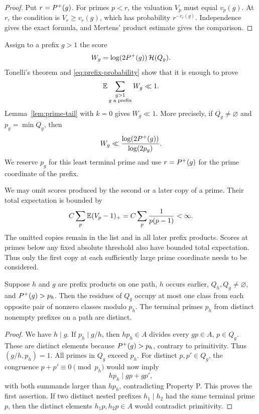 \begin{proof}
Put \(r=P^{+}(g)\). For primes \(p<r\), the valuation
\(V_p\) must equal \(v_p(g)\). At \(r\), the condition is
\(V_r\ge v_r(g)\), which has probability \(r^{-v_r(g)}\).
Independence gives the exact formula, and Mertens' product
estimate gives the comparison.
\end{proof}

Assign to a prefix \(g>1\) the score
\[
 W_g=\log(2P^{+}(g))\,\mathcal H(Q_g).
\]
Tonelli's theorem and \eqref{eq:prefix-probability} show
that it is enough to prove
\begin{equation}\label{eq:expected-score}
 \mathbb E\sum_{\substack{g>1\\g\text{ a prefix}}}W_g\ll1.
\end{equation}
Lemma~\ref{lem:prime-tail} with \(k=0\) gives \(W_g\ll1\).
More precisely, if \(Q_g\ne\varnothing\) and
\(p_g=\min Q_g\), then
\begin{equation}\label{eq:score-basic}
 W_g\ll\frac{\log(2P^{+}(g))}{\log(2p_g)}.
\end{equation}
We reserve \(p_g\) for this least terminal prime and use
\(r=P^{+}(g)\) for the prime coordinate of the prefix.

We may omit scores produced by the second or a later
copy of a prime. Their total expectation is bounded by
\[
 C\sum_p\mathbb E(V_p-1)_+
     =C\sum_p\frac1{p(p-1)}<\infty.
\]
The omitted copies remain in the list and in all later
prefix products. Scores at primes below any fixed absolute
threshold also have bounded total expectation.
Thus only the first copy at each sufficiently large
prime coordinate needs to be considered.

\begin{lemma}\label{lem:inheritance}
Suppose \(h\) and \(g\) are prefix products on one path,
\(h\) occurs earlier, \(Q_h,Q_g\ne\varnothing\), and
\(P^{+}(g)>p_h\). Then the residues of \(Q_g\) occupy
at most one class from each opposite pair of nonzero
classes modulo \(p_h\). The terminal primes \(p_h\)
from distinct nonempty prefixes on a path are distinct.
\end{lemma}

\begin{proof}
We have \(h\mid g\). If \(p_h\mid g/h\), then
\(hp_h\in A\) divides every \(gp\in A\), \(p\in Q_g\).
These are distinct elements because \(P^{+}(g)>p_h\),
contrary to primitivity. Thus \((g/h,p_h)=1\).
All primes in \(Q_g\) exceed \(p_h\).
For distinct \(p,p'\in Q_g\), the congruence
\(p+p'\equiv0\pmod{p_h}\) would now imply
\[
 hp_h\mid gp+gp',
\]
with both summands larger than \(hp_h\), contradicting
Property P. This proves the first assertion.
If two distinct nested prefixes \(h_1\mid h_2\) had the
same terminal prime \(p\), then the distinct elements
\(h_1p,h_2p\in A\) would contradict primitivity.
\end{proof}

